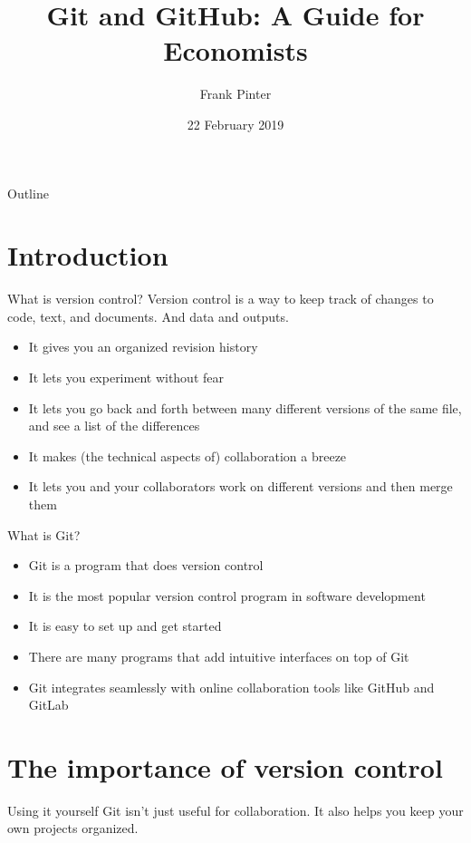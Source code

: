 \documentclass{beamer}
\title[Git for Economists]{Git and GitHub: A Guide for Economists}
\author{Frank Pinter}
\date{22 February 2019}
\begin{document}
\begin{frame}
  \titlepage
\end{frame}

\begin{frame}{Outline}
  \tableofcontents
\end{frame}

\section*{Introduction}

\begin{frame}{What is version control?}
Version control is a way to keep track of changes to code, text, and documents. And data and outputs.
\begin{itemize}
\item It gives you an organized revision history
\item It lets you experiment without fear
\item It lets you go back and forth between many different versions of the same file, and see a list of the differences
\item It makes (the technical aspects of) collaboration a breeze
\item It lets you and your collaborators work on different versions and then merge them
\end{itemize}
\end{frame}

\begin{frame}{What is Git?}
\begin{itemize}
\item Git is a program that does version control
\item It is the most popular version control program in software development
\item It is easy to set up and get started
\item There are many programs that add intuitive interfaces on top of Git
\item Git integrates seamlessly with online collaboration tools like GitHub and GitLab
\end{itemize}
\end{frame}

\section{The importance of version control}

\begin{frame}{Using it yourself}
Git isn't just useful for collaboration. It also helps you keep your own projects organized.
\end{frame}
\end{document}
